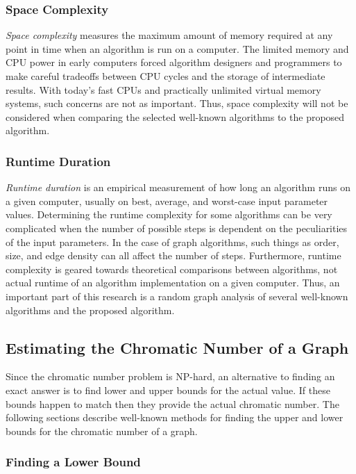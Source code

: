 \subsubsection{Space Complexity}\label{sec:sub:sub:space}

\emph{Space complexity} measures the maximum amount of memory required at any point in time when an algorithm is
run on a computer.  The limited memory and CPU power in early computers forced algorithm designers and programmers
to make careful tradeoffs between CPU cycles and the storage of intermediate results.  With today's fast CPUs and
practically unlimited virtual memory systems, such concerns are not as important.  Thus, space complexity will not
be considered when comparing the selected well-known algorithms to the proposed algorithm.

\subsubsection{Runtime Duration}\label{sec:sub:sub:duration}

\emph{Runtime duration} is an empirical measurement of how long an algorithm runs on a given computer, usually on
best, average, and worst-case input parameter values.  Determining the runtime complexity for some algorithms can
be very complicated when the number of possible steps is dependent on the peculiarities of the input parameters.
In the case of graph algorithms, such things as order, size, and edge density can all affect the number of steps.
Furthermore, runtime complexity is geared towards theoretical comparisons between algorithms, not actual runtime of
an algorithm implementation on a given computer.  Thus, an important part of this research is a random graph
analysis of several well-known algorithms and the proposed algorithm.

\subsection{Estimating the Chromatic Number of a Graph}

Since the chromatic number problem is NP-hard, an alternative to finding an exact answer is to find lower and upper
bounds for the actual value.  If these bounds happen to match then they provide the actual chromatic number.  The
following sections describe well-known methods for finding the upper and lower bounds for the chromatic number of a
graph.

\subsubsection{Finding a Lower Bound}\label{sec:sub:sub:lower}


